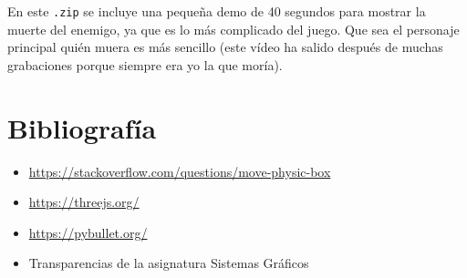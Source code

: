\documentclass[11pt,a4paper]{article}
\begin{document}
En este \texttt{.zip} se incluye una pequeña demo de 40 segundos para mostrar la muerte del enemigo, ya que es lo más complicado del juego. Que sea el personaje principal quién muera es más sencillo (este vídeo ha salido después de muchas grabaciones porque siempre era yo la que moría).

\section{Bibliografía}

\begin{itemize}
	\item \color{blue}\href{https://stackoverflow.com/questions/34569703/raycaster-does-not-move-boxmesh-objects}{https://stackoverflow.com/questions/move-physic-box}\color{black}
	\item \color{blue}\href{https://threejs.org/}{https://threejs.org/}\color{black}
	\item \color{blue}\href{https://pybullet.org/Bullet/phpBB3/index.php?sid=0e8c6e5111583be0d17f1731e4c1dc19}{https://pybullet.org/}\color{black}
	\item Transparencias de la asignatura Sistemas Gráficos
\end{itemize}
\end{document}
